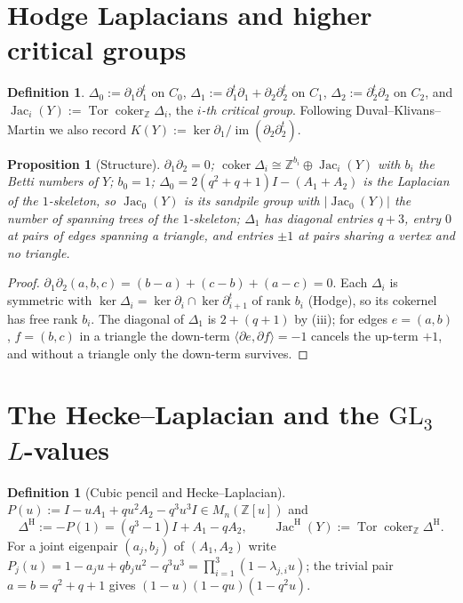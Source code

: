 \documentclass[11pt]{amsart}
\numberwithin{equation}{section}
\newtheorem{proposition}[theorem]{Proposition}
\theoremstyle{definition}
\newtheorem{definition}[theorem]{Definition}
\theoremstyle{remark}
\newcommand{\Z}{\mathbb{Z}}
\newcommand{\Jac}{\operatorname{Jac}}
\newcommand{\coker}{\operatorname{coker}}
\newcommand{\Tor}{\operatorname{Tor}}
\newcommand{\DeltaH}{\Delta^{\mathrm{H}}}
\newcommand{\JacH}{\Jac^{\mathrm{H}}}
\begin{document}
\section{Hodge Laplacians and higher critical groups}\label{sec:hodge}

\begin{definition}\label{def:hodge}
$\Delta_0:=\partial_1\partial_1^{t}$ on $C_0$, $\Delta_1:=\partial_1^{t}\partial_1
+\partial_2\partial_2^{t}$ on $C_1$, $\Delta_2:=\partial_2^{t}\partial_2$ on $C_2$, and
$\Jac_i(Y):=\Tor\coker_\Z\Delta_i$, the \emph{$i$-th critical group}. Following
Duval--Klivans--Martin \cite{DKM} we also record $K(Y):=\ker\partial_1/\operatorname{im}
(\partial_2\partial_2^{t})$.
\end{definition}

\begin{proposition}[Structure]\label{prop:hodge}
$\partial_1\partial_2=0$; $\coker\Delta_i\cong\Z^{b_i}\oplus\Jac_i(Y)$ with $b_i$ the Betti
numbers of $Y$; $b_0=1$; $\Delta_0=2(q^{2}+q+1)I-(A_1+A_2)$ is the Laplacian of the
$1$-skeleton, so $\Jac_0(Y)$ is its sandpile group with $|\Jac_0(Y)|$ the number of
spanning trees of the $1$-skeleton; $\Delta_1$ has diagonal entries $q+3$, entry $0$ at pairs
of edges spanning a triangle, and entries $\pm1$ at pairs sharing a vertex and no triangle.
\end{proposition}

\begin{proof}
$\partial_1\partial_2(a,b,c)=(b-a)+(c-b)+(a-c)=0$. Each $\Delta_i$ is symmetric with
$\ker\Delta_i=\ker\partial_i\cap\ker\partial_{i+1}^{t}$ of rank $b_i$ (Hodge), so its
cokernel has free rank $b_i$. The diagonal of $\Delta_1$ is $2+(q+1)$ by (iii); for edges
$e=(a,b)$, $f=(b,c)$ in a triangle the down-term $\langle\partial e,\partial f\rangle=-1$
cancels the up-term $+1$, and without a triangle only the down-term survives.
\end{proof}

\section{The Hecke--Laplacian and the \texorpdfstring{$\mathrm{GL}_3$ $L$-values}{GL3 L-values}}\label{sec:hecke}

\begin{definition}[Cubic pencil and Hecke--Laplacian]\label{def:pencil}
$P(u):=I-uA_1+qu^{2}A_2-q^{3}u^{3}I\in M_n(\Z[u])$ and
\[
\DeltaH:=-P(1)=(q^{3}-1)I+A_1-qA_2,\qquad \JacH(Y):=\Tor\coker_\Z\DeltaH .
\]
For a joint eigenpair $(a_j,b_j)$ of $(A_1,A_2)$ write $P_j(u)=1-a_ju+qb_ju^{2}-q^{3}u^{3}
=\prod_{i=1}^{3}(1-\lambda_{j,i}u)$; the trivial pair $a=b=q^{2}+q+1$ gives
$(1-u)(1-qu)(1-q^{2}u)$.
\end{definition}
\end{document}
